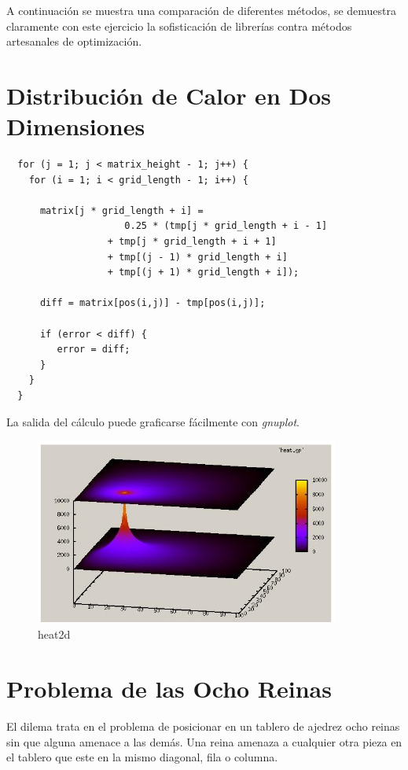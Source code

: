 \documentclass[a4paper]{report}
\begin{document}
A continuaci\'on se muestra una comparaci\'on de diferentes m\'etodos, se
demuestra claramente con este ejercicio la sofisticaci\'on de librer\'ias
contra m\'etodos artesanales de optimizaci\'on.

\section{Distribuci\'on de Calor en Dos Dimensiones}

\begin{verbatim}
  for (j = 1; j < matrix_height - 1; j++) {
    for (i = 1; i < grid_length - 1; i++) {
      
      matrix[j * grid_length + i] = 
                     0.25 * (tmp[j * grid_length + i - 1]
                  + tmp[j * grid_length + i + 1]
                  + tmp[(j - 1) * grid_length + i]
                  + tmp[(j + 1) * grid_length + i]);

      diff = matrix[pos(i,j)] - tmp[pos(i,j)];

      if (error < diff) {
         error = diff;
      }
    }
  }
\end{verbatim}

La salida del c\'alculo puede graficarse f\'acilmente con {\it gnuplot}.

\begin{figure}[H]
\begin{center}
\includegraphics[width=10cm]{heat2d.png}
\caption{heat2d}
\end{center}
\end{figure}

\section{Problema de las Ocho Reinas}

El dilema trata en el problema de posicionar en un tablero de ajedrez ocho
reinas sin que alguna amenace a las dem\'as. Una reina amenaza a cualquier otra
pieza en el tablero que este en la mismo diagonal, fila o columna.
\end{document}
